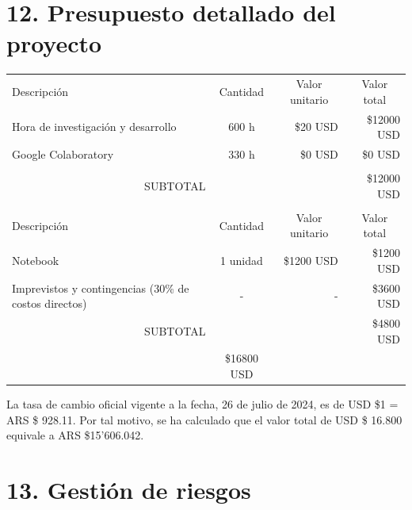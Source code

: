 \documentclass[
11pt, %
codirector, %
]{charter}
\begin{document}
\section{12. Presupuesto detallado del proyecto}
\label{sec:presupuesto}

\begin{table}[htpb]
\centering
\begin{tabularx}{\linewidth}{@{}|X|c|r|r|@{}}
\hline
\rowcolor[HTML]{C0C0C0} 
\multicolumn{4}{|c|}{\cellcolor[HTML]{C0C0C0}COSTOS DIRECTOS} \\ \hline
\rowcolor[HTML]{C0C0C0} 
Descripción &
  \multicolumn{1}{c|}{\cellcolor[HTML]{C0C0C0}Cantidad} &
  \multicolumn{1}{c|}{\cellcolor[HTML]{C0C0C0}Valor unitario} &
  \multicolumn{1}{c|}{\cellcolor[HTML]{C0C0C0}Valor total} \\ \hline
Hora de investigación y desarrollo &
  600 h &
  \$20 USD &
  \$12000 USD \\ \hline
Google Colaboratory &
  330 h &
  \$0 USD &
  \$0 USD \\ \hline
 &
  \multicolumn{1}{c|}{} &
  \multicolumn{1}{c|}{} &
  \multicolumn{1}{c|}{} \\ \hline
\multicolumn{3}{|c|}{SUBTOTAL} &
  \$12000 USD \\ \hline
\rowcolor[HTML]{C0C0C0} 
\multicolumn{4}{|c|}{\cellcolor[HTML]{C0C0C0}COSTOS INDIRECTOS} \\ \hline
\rowcolor[HTML]{C0C0C0} 
Descripción &
  \multicolumn{1}{c|}{\cellcolor[HTML]{C0C0C0}Cantidad} &
  \multicolumn{1}{c|}{\cellcolor[HTML]{C0C0C0}Valor unitario} &
  \multicolumn{1}{c|}{\cellcolor[HTML]{C0C0C0}Valor total} \\ \hline
Notebook &
  1 unidad &
  \$1200 USD &
  \$1200 USD \\ \hline
Imprevistos y contingencias (30\% de costos directos) &
  - &
  - &
  \$3600 USD \\ \hline
\multicolumn{3}{|c|}{SUBTOTAL} &
  \$4800 USD \\ \hline
\rowcolor[HTML]{C0C0C0}
\multicolumn{3}{|c|}{TOTAL} &
  \$16800 USD \\ \hline
\end{tabularx}%
\end{table}

La tasa de cambio oficial vigente a la fecha, 26 de julio de 2024, es de USD \$1 = ARS \$ 928.11. Por tal motivo, se ha calculado que el valor total de USD \$ 16.800 equivale a ARS \$15'606.042. 

\section{13. Gestión de riesgos}
\label{sec:riesgos}
\end{document}
